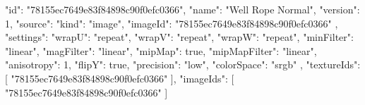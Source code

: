 {
  "id": "78155ec7649e83f84898c90f0efc0366",
  "name": "Well Rope Normal",
  "version": 1,
  "source": {
    "kind": "image",
    "imageId": "78155ec7649e83f84898c90f0efc0366"
  },
  "settings": {
    "wrapU": "repeat",
    "wrapV": "repeat",
    "wrapW": "repeat",
    "minFilter": "linear",
    "magFilter": "linear",
    "mipMap": true,
    "mipMapFilter": "linear",
    "anisotropy": 1,
    "flipY": true,
    "precision": "low",
    "colorSpace": "srgb"
  },
  "textureIds": [
    "78155ec7649e83f84898c90f0efc0366"
  ],
  "imageIds": [
    "78155ec7649e83f84898c90f0efc0366"
  ]
}
